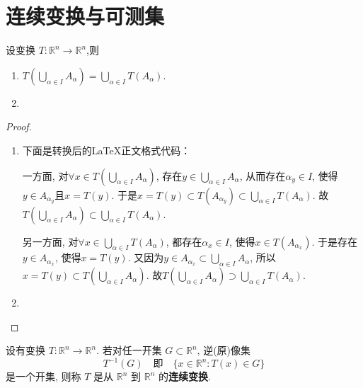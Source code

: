 \documentclass[../../main.tex]{subfiles}
\begin{document}
\section{连续变换与可测集}

\begin{theorem}[变换的基本性质]\label{theorem:变换的基本性质}
设变换 $T:\mathbb{R}^n\to\mathbb{R}^n$,则
\begin{enumerate}
\item $T\left( \bigcup_{\alpha \in I}{A_{\alpha}} \right) =\bigcup_{\alpha \in I}{T\left( A_{\alpha} \right)}$.

\item 
\end{enumerate}
\end{theorem}
\begin{proof}
\begin{enumerate}
\item 下面是转换后的LaTeX正文格式代码：

一方面, 对$\forall x\in T\left( \bigcup_{\alpha \in I}{A_{\alpha}} \right)$, 存在$y\in \bigcup_{\alpha \in I}{A_{\alpha}}$, 从而存在$\alpha _y\in I$, 使得$y\in A_{\alpha _y}$且$x=T\left( y \right)$. 于是$x=T\left( y \right) \subset T\left( A_{\alpha _y} \right) \subset \bigcup_{\alpha \in I}{T\left( A_{\alpha} \right)}$. 故$T\left( \bigcup_{\alpha \in I}{A_{\alpha}} \right) \subset \bigcup_{\alpha \in I}{T\left( A_{\alpha} \right)}$.

另一方面, 对$\forall x\in \bigcup_{\alpha \in I}{T\left( A_{\alpha} \right)}$, 都存在$\alpha _x\in I$, 使得$x\in T\left( A_{\alpha _x} \right)$. 于是存在$y\in A_{\alpha _x}$, 使得$x=T\left( y \right)$. 又因为$y\in A_{\alpha _x}\subset \bigcup_{\alpha \in I}{A_{\alpha}}$, 所以$x=T\left( y \right) \subset T\left( \bigcup_{\alpha \in I}{A_{\alpha}} \right)$. 故$T\left( \bigcup_{\alpha \in I}{A_{\alpha}} \right) \supset \bigcup_{\alpha \in I}{T\left( A_{\alpha} \right)}$.

\item 
\end{enumerate}

\end{proof}

\begin{definition}[连续变换]
设有变换 $T:\mathbb{R}^n\to\mathbb{R}^n$. 若对任一开集 $G\subset\mathbb{R}^n$, 逆(原)像集
\[
T^{-1}(G)\quad \text{即}\quad \{x\in\mathbb{R}^n:T(x)\in G\}
\]
是一个开集, 则称 $T$ 是从 $\mathbb{R}^n$ 到 $\mathbb{R}^n$ 的\textbf{连续变换}.
\end{definition}
\end{document}
